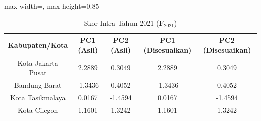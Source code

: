 \begin{table}[H]
\centering
\caption{Skor Intra Tahun 2021 ($\mathbf{F}_{2021}$)} \label{tab:sampleskor_intra_2021}
\begin{adjustbox}{max width=\textwidth, max height=0.85\textheight}
\begin{tabular}{|c|c|c|c|c|}
\hline
\textbf{Kabupaten/Kota} & \textbf{PC1 (Asli)} & \textbf{PC2 (Asli)} & \textbf{PC1 (Disesuaikan)} & \textbf{PC2 (Disesuaikan)} \\
\hline
Kota Jakarta Pusat & 2.2889 & 0.3049 & 2.2889 & 0.3049 \\
Bandung Barat & -1.3436 & 0.4052 & -1.3436 & 0.4052 \\
Kota Tasikmalaya & 0.0167 & -1.4594 & 0.0167 & -1.4594 \\
Kota Cilegon & 1.1601 & 1.3242 & 1.1601 & 1.3242 \\
\hline
\end{tabular}
\end{adjustbox}
\end{table}